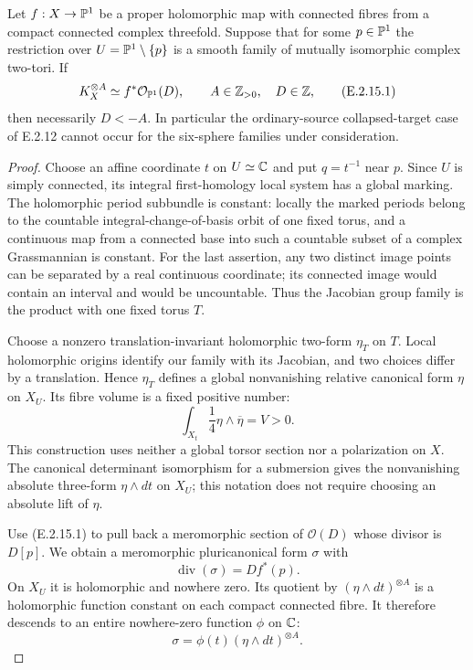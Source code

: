 \begin{proposition}
Let $f:X\to\mathbb P^1$ be a proper holomorphic map with connected
fibres from a compact connected complex threefold.  Suppose
that for some $p\in\mathbb P^1$ the restriction over
$U=\mathbb P^1\setminus\{p\}$ is a smooth family of mutually
isomorphic complex two-tori.  If
\[
 K_X^{\otimes A}\simeq f^*\mathcal O_{\mathbb P^1}(D),
 \qquad A\in\mathbb Z_{>0},\quad D\in\mathbb Z,
 \tag{E.2.15.1}
\]
then necessarily $D<-A$.  In particular the ordinary-source
collapsed-target case of E.2.12 cannot occur for the
six-sphere families under consideration.
\end{proposition}
\begin{proof}
Choose an affine coordinate $t$ on $U\simeq\mathbb C$ and put
$q=t^{-1}$ near $p$.  Since $U$ is simply connected, its
integral first-homology local system has a global marking.
The holomorphic period subbundle is constant: locally the
marked periods belong to the countable integral-change-of-basis
orbit of one fixed torus, and a continuous map from a connected
base into such a countable subset of a complex Grassmannian
is constant.  For the last assertion, any two distinct image
points can be separated by a real continuous coordinate;
its connected image would contain an interval and would be
uncountable.  Thus the Jacobian group family is the product
with one fixed torus $T$.

Choose a nonzero translation-invariant holomorphic two-form
$\eta_T$ on $T$.  Local holomorphic origins identify our
family with its Jacobian, and two choices differ by a
translation.  Hence $\eta_T$ defines a global nonvanishing
relative canonical form $\eta$ on $X_U$.  Its fibre volume
is a fixed positive number:
\[
 \int_{X_t}\frac14\eta\wedge\overline\eta=V>0.
 \tag{E.2.15.2}
\]
This construction uses neither a global torsor section nor
a polarization on $X$.  The canonical determinant
isomorphism for a submersion gives the nonvanishing
absolute three-form $\eta\wedge dt$ on $X_U$; this notation
does not require choosing an absolute lift of $\eta$.

Use (E.2.15.1) to pull back a meromorphic section of
$\mathcal O(D)$ whose divisor is $D[p]$.  We obtain a
meromorphic pluricanonical form $\sigma$ with
\[
 \operatorname{div}(\sigma)=D f^*(p).
\]
On $X_U$ it is holomorphic and nowhere zero.  Its quotient
by $(\eta\wedge dt)^{\otimes A}$ is a holomorphic function
constant on each compact connected fibre.  It therefore
descends to an entire nowhere-zero function $\phi$ on $\mathbb C$:
\[
 \sigma=\phi(t)(\eta\wedge dt)^{\otimes A}.
 \tag{E.2.15.3}
\]


\end{proof}
